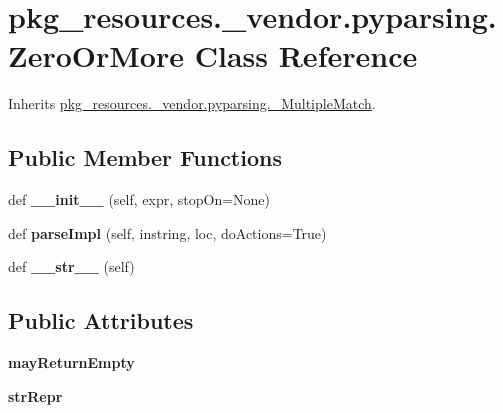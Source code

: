 \hypertarget{classpkg__resources_1_1__vendor_1_1pyparsing_1_1_zero_or_more}{}\section{pkg\+\_\+resources.\+\_\+vendor.\+pyparsing.\+Zero\+Or\+More Class Reference}
\label{classpkg__resources_1_1__vendor_1_1pyparsing_1_1_zero_or_more}


Inherits \hyperlink{classpkg__resources_1_1__vendor_1_1pyparsing_1_1___multiple_match}{pkg\+\_\+resources.\+\_\+vendor.\+pyparsing.\+\_\+\+Multiple\+Match}.

\subsection*{Public Member Functions}
\begin{DoxyCompactItemize}
\item 
\mbox{\label{classpkg__resources_1_1__vendor_1_1pyparsing_1_1_zero_or_more_a07a9f74ce8d589b4f84b37c4b3ae2c41}} 
def {\bfseries \+\_\+\+\_\+init\+\_\+\+\_\+} (self, expr, stop\+On=None)
\item 
\mbox{\label{classpkg__resources_1_1__vendor_1_1pyparsing_1_1_zero_or_more_aa0f6130f0c3ccc8d0442ab136bd2a62b}} 
def {\bfseries parse\+Impl} (self, instring, loc, do\+Actions=True)
\item 
\mbox{\label{classpkg__resources_1_1__vendor_1_1pyparsing_1_1_zero_or_more_a0f970a46e2b6de5757ee987f49e53af7}} 
def {\bfseries \+\_\+\+\_\+str\+\_\+\+\_\+} (self)
\end{DoxyCompactItemize}
\subsection*{Public Attributes}
\begin{DoxyCompactItemize}
\item 
\mbox{\label{classpkg__resources_1_1__vendor_1_1pyparsing_1_1_zero_or_more_a813de8236ddd545b42384e7b9532859a}} 
{\bfseries may\+Return\+Empty}
\item 
\mbox{\label{classpkg__resources_1_1__vendor_1_1pyparsing_1_1_zero_or_more_aa244b0240baa581345171d60304cf4f5}} 
{\bfseries str\+Repr}
\end{DoxyCompactItemize}
